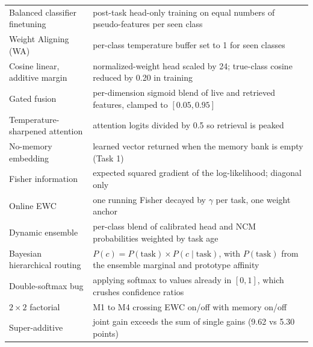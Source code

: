 \documentclass[11pt,a4paper]{article}
\begin{document}
\begin{longtable}{L{4.6cm} L{11.4cm}}
Balanced classifier finetuning & post-task head-only training on equal numbers of pseudo-features per seen class \\
Weight Aligning (WA) & per-class temperature buffer set to 1 for seen classes \\
Cosine linear, additive margin & normalized-weight head scaled by 24; true-class cosine reduced by 0.20 in training \\
Gated fusion & per-dimension sigmoid blend of live and retrieved features, clamped to $[0.05, 0.95]$ \\
Temperature-sharpened attention & attention logits divided by 0.5 so retrieval is peaked \\
No-memory embedding & learned vector returned when the memory bank is empty (Task 1) \\
Fisher information & expected squared gradient of the log-likelihood; diagonal only \\
Online EWC & one running Fisher decayed by $\gamma$ per task, one weight anchor \\
Dynamic ensemble & per-class blend of calibrated head and NCM probabilities weighted by task age \\
Bayesian hierarchical routing & $P(c) = P(\mathrm{task}) \times P(c \mid \mathrm{task})$, with $P(\mathrm{task})$ from the ensemble marginal and prototype affinity \\
Double-softmax bug & applying softmax to values already in $[0, 1]$, which crushes confidence ratios \\
$2 \times 2$ factorial & M1 to M4 crossing EWC on/off with memory on/off \\
Super-additive & joint gain exceeds the sum of single gains (9.62 vs 5.30 points) \\
\end{longtable}
\end{document}

